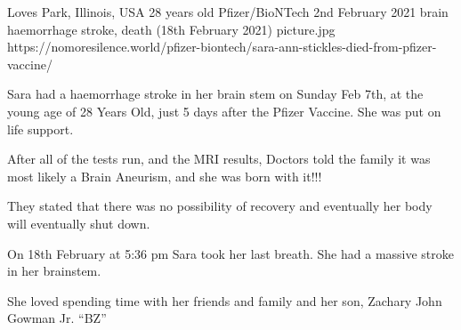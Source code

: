 {Loves Park, Illinois, USA}
{28 years old}
{Pfizer/BioNTech }
{2nd February 2021}
{brain haemorrhage stroke, death (18th February 2021)}
{picture.jpg}
{https://nomoresilence.world/pfizer-biontech/sara-ann-stickles-died-from-pfizer-vaccine/}
{

Sara had a haemorrhage stroke in her brain stem on Sunday Feb 7th, at the young
age of 28 Years Old, just 5 days after the Pfizer Vaccine. She was put on life
support.

After all of the tests run, and the MRI results, Doctors told the family it was
most likely a Brain Aneurism, and she was born with it!!!

They stated that there was no possibility of recovery and eventually her body
will eventually shut down.

On 18th February at 5:36 pm Sara took her last breath. She had a massive stroke
in her brainstem.

She loved spending time with her friends and family and her son, Zachary John
Gowman Jr. “BZ”

}
